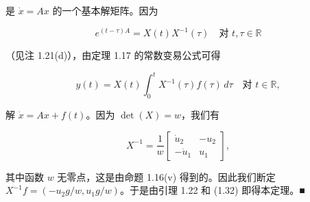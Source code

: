 \begin{theorem}
是 $ \dot{x} = Ax $ 的一个基本解矩阵。因为

\[
e^{(t-\tau)A} = X(t)X^{-1}(\tau) \quad \text{对 } t, \tau \in \mathbb{R}
\]

（见注 1.21(d)），由定理 1.17 的常数变易公式可得

\begin{equation}
y(t) = X(t)\int_{0}^{t}X^{-1}(\tau)f(\tau)\,d\tau \quad \text{对 } t \in \mathbb{R} ,\tag{1.32}
\end{equation}

解 $ \dot{x} = Ax + f(t) $。因为 $ \det(X) = w $，我们有

\begin{equation*}
X^{-1} = \frac{1}{w}\begin{bmatrix} \dot{u}_{2} & -u_{2} \\ -\dot{u}_{1} & u_{1} \end{bmatrix} ,
\end{equation*}

其中函数 $ w $ 无零点，这是由命题 1.16(v) 得到的。因此我们断定 $ X^{-1}f = (-u_{2}g/w, u_{1}g/w) $。于是由引理 1.22 和 (1.32) 即得本定理。\nobreak\hspace{0.35em}■

\end{theorem}


